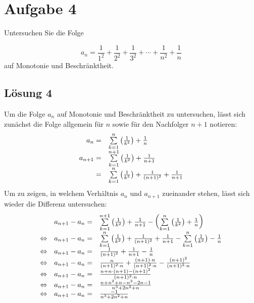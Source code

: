 \section*{Aufgabe 4}

Untersuchen Sie die Folge


\begin{equation*}
  a_{n} =\frac{1}{1^{2}} +\frac{1}{2^{2}} +\frac{1}{3^{2}} +\cdots +\frac{1}{n^{2}} +\frac{1}{n}
\end{equation*}
auf Monotonie und Beschränktheit.

\subsection*{Lösung 4}

Um die Folge $\displaystyle a_{n}$ auf Monotonie und Beschränktheit zu untersuchen, lässt sich zunächst die Folge allgemein für $\displaystyle n$ sowie für den Nachfolger $\displaystyle n+1$ notieren:
\begin{equation*}
  \begin{array}{ r l }
    a_{n} = & \sum\limits _{k=1}^{n}\left(\frac{1}{k^{2}}\right) +\frac{1}{n}\\
    a_{n+1} = & \sum\limits _{k=1}^{n+1}\left(\frac{1}{k^{2}}\right) +\frac{1}{n+1}\\
    = & \sum\limits _{k=1}^{n}\left(\frac{1}{k^{2}}\right) +\frac{1}{( n+1)^{2}} +\frac{1}{n+1}
  \end{array}
\end{equation*}
Um zu zeigen, in welchem Verhältnis $\displaystyle a_{n}$ und $\displaystyle a_{n+1}$ zueinander stehen, lässt sich wieder die Differenz untersuchen:
\begin{equation*}
  \begin{array}{ c c l }
    & a_{n+1} -a_{n} = & \sum\limits _{k=1}^{n+1}\left(\frac{1}{k^{2}}\right) +\frac{1}{n+1} -\left(\sum\limits _{k=1}^{n}\left(\frac{1}{k^{2}}\right) +\frac{1}{n}\right)\\
    \Leftrightarrow  & a_{n+1} -a_{n} = & \sum\limits _{k=1}^{n}\left(\frac{1}{k^{2}}\right) +\frac{1}{( n+1)^{2}} +\frac{1}{n+1} -\sum\limits _{k=1}^{n}\left(\frac{1}{k^{2}}\right) -\frac{1}{n}\\
    \Leftrightarrow  & a_{n+1} -a_{n} = & \frac{1}{( n+1)^{2}} +\frac{1}{n+1} -\frac{1}{n}\\
    \Leftrightarrow  & a_{n+1} -a_{n} = & \frac{n}{( n+1)^{2} \cdot n} +\frac{( n+1) \cdot n}{( n+1)^{2} \cdot n} -\frac{( n+1)^{2}}{( n+1)^{2} \cdot n}\\
    \Leftrightarrow  & a_{n+1} -a_{n} = & \frac{n+n\cdot ( n+1) -( n+1)^{2}}{( n+1)^{2} \cdot n}\\
    \Leftrightarrow  & a_{n+1} -a_{n} = & \frac{n+n^{2} +n-n^{2} -2n-1}{n^{3} +2n^{2} +n}\\
    \Leftrightarrow  & a_{n+1} -a_{n} = & \frac{-1}{n^{3} +2n^{2} +n}
  \end{array}
\end{equation*}
